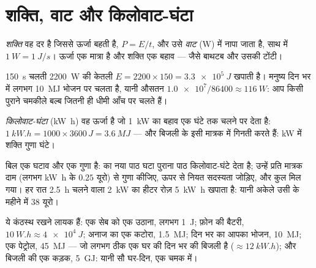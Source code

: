 \section{शक्ति, वाट और किलोवाट-घंटा}

\begin{definition}[शक्ति]\label{def:g10:energy-conservation:power}
\emph{शक्ति} वह दर है जिससे ऊर्जा बहती है, $P = E/t$,
और उसे \emph{वाट} (\unit{W}) में नापा जाता है, साथ में
$\qty{1}{W} = \qty{1}{J/s}$। ऊर्जा एक मात्रा है और शक्ति एक बहाव --- जैसे बाथटब और
उसकी टोंटी।
\end{definition}

\begin{example}[केतली बनाम मनुष्य]\label{ex:g10:energy-conservation:power}
\qty{150}{s} चलती \qty{2200}{W} की केतली $E = 2200 \times 150 = \qty{3.3e5}{J}$ खपाती है। मनुष्य दिन भर में लगभग
\qty{10}{MJ} भोजन पर चलता है, यानी औसतन $\num{1.0e7}/\num{86400} \approx \qty{116}{W}$: आप किसी पुराने चमकीले बल्ब
जितनी ही धीमी आँच पर चलते हैं।
\end{example}

\begin{definition}[किलोवाट-घंटा]\label{def:g10:energy-conservation:kwh}
\emph{किलोवाट-घंटा} (\unit{kW.h}) वह ऊर्जा है जो
\qty{1}{kW} का बहाव एक घंटे तक चलने पर देता है:
$\qty{1}{kW.h} = 1000 \times 3600\,\unit{J} = \qty{3.6}{MJ}$ --- और बिजली के  इसी मात्रक में गिनती करते हैं:
\unit{kW} में शक्ति गुणा घंटे।
\end{definition}

\begin{example}[बिल पढ़ना]\label{ex:g10:energy-conservation:bill}
बिल एक घटाव और एक गुणा है:  का नया पाठ घटा पुराना पाठ
किलोवाट-घंटे देता है; उन्हें प्रति मात्रक दाम (लगभग
\unit{kW.h} के $0.25$ यूरो) से गुणा कीजिए, ऊपर से नियत सदस्यता जोड़िए, और
कुल मिल गया। हर रात \qty{2.5}{h} चलने वाला \qty{2}{kW} का हीटर रोज़ \qty{5}{kW.h}
खपाता है: यानी अकेले उसी के महीने में $38$ यूरो।
\end{example}

\begin{example}[परिमाण की कोटियाँ]\label{ex:g10:energy-conservation:orders}
ये कंठस्थ रखने लायक हैं: एक सेब को एक  उठाना, लगभग \qty{1}{J};
फ़ोन की बैटरी, $\qty{10}{W.h} \approx \qty{4e4}{J}$; अनाज का एक कटोरा, \qty{1.5}{MJ}; दिन भर का आपका भोजन,
\qty{10}{MJ}; एक  पेट्रोल, \qty{45}{MJ} --- जो लगभग ठीक एक घर की
दिन भर की बिजली है ($\approx \qty{12}{kW.h}$); और बिजली की एक कड़क, \qty{5}{GJ}: यानी सौ
घर-दिन, एक चमक में।
\end{example}

